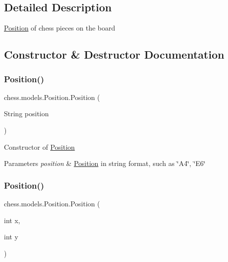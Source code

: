 \subsection{Detailed Description}
\mbox{\hyperlink{classchess_1_1models_1_1_position}{Position}} of chess pieces on the board 

\subsection{Constructor \& Destructor Documentation}
\mbox{\label{classchess_1_1models_1_1_position_af2ca0e2b74a18503f08e8492a52501c1}} 
\subsubsection{\texorpdfstring{Position()}{Position()}\hspace{0.1cm}{\footnotesize\ttfamily [1/2]}}
{\footnotesize\ttfamily chess.\+models.\+Position.\+Position (\begin{DoxyParamCaption}\item[{String}]{position }\end{DoxyParamCaption})}

Constructor of \mbox{\hyperlink{classchess_1_1models_1_1_position}{Position}}


\begin{DoxyParams}{Parameters}
{\em position} & \mbox{\hyperlink{classchess_1_1models_1_1_position}{Position}} in string format, such as \char`\"{}\+A4\char`\"{}, \char`\"{}\+E6\char`\"{} \\
\hline
\end{DoxyParams}
\mbox{\label{classchess_1_1models_1_1_position_aa5e15407a249f22ba683d43083c3f16b}} 
\subsubsection{\texorpdfstring{Position()}{Position()}\hspace{0.1cm}{\footnotesize\ttfamily [2/2]}}
{\footnotesize\ttfamily chess.\+models.\+Position.\+Position (\begin{DoxyParamCaption}\item[{int}]{x,  }\item[{int}]{y }\end{DoxyParamCaption})}

